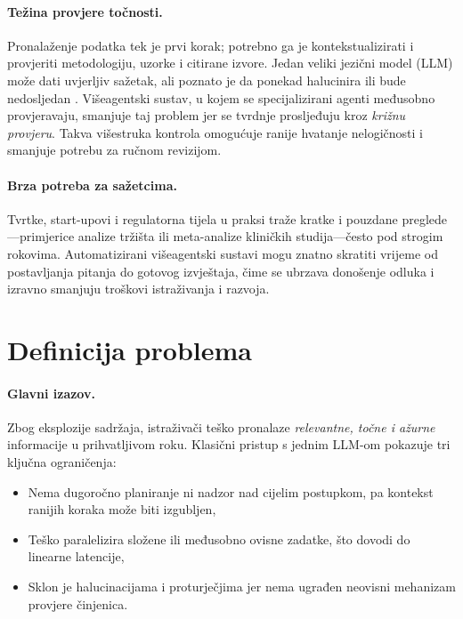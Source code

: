 \documentclass[zavrsnirad]{fer}
\begin{document}
\paragraph{Težina provjere točnosti.}
Pronalaženje podatka tek je prvi korak; potrebno ga je kontekstualizirati i provjeriti metodologiju, uzorke i citirane izvore. Jedan veliki jezični model (LLM) može dati uvjerljiv sažetak, ali poznato je da ponekad halucinira ili bude nedosljedan \cite{Ji2023}. Višeagentski sustav, u kojem se specijalizirani agenti međusobno provjeravaju, smanjuje taj problem jer se tvrdnje prosljeđuju kroz \emph{križnu provjeru}. Takva višestruka kontrola omogućuje ranije hvatanje nelogičnosti i smanjuje potrebu za ručnom revizijom.

\paragraph{Brza potreba za sažetcima.}
Tvrtke, start-upovi i regulatorna tijela u praksi traže kratke i pouzdane preglede—primjerice analize tržišta ili meta-analize kliničkih studija—često pod strogim rokovima. Automatizirani višeagentski sustavi mogu znatno skratiti vrijeme od postavljanja pitanja do gotovog izvještaja, čime se ubrzava donošenje odluka i izravno smanjuju troškovi istraživanja i razvoja.

\section{Definicija problema}
\label{sec:problem}

\paragraph{Glavni izazov.}
Zbog eksplozije sadržaja, istraživači teško pronalaze \emph{relevantne, točne i ažurne} informacije u prihvatljivom roku. Klasični pristup s jednim LLM-om pokazuje tri ključna ograničenja:
\begin{itemize}
  \item Nema dugoročno planiranje ni nadzor nad cijelim postupkom, pa kontekst ranijih koraka može biti izgubljen,
  \item Teško paralelizira složene ili međusobno ovisne zadatke, što dovodi do linearne latencije,
  \item Sklon je halucinacijama i proturječjima jer nema ugrađen neovisni mehanizam provjere činjenica.
\end{itemize}
\end{document}
